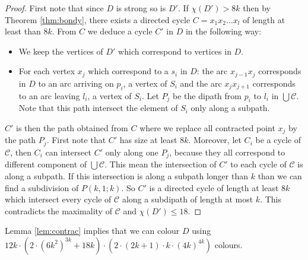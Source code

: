 \documentclass[utf8,10pt]{article}
\theoremstyle{plain}
\theoremstyle{definition}
\theoremstyle{remark}
\newcommand{\dr}{ (2k+1)\cdot k \cdot (4k)^{4k}}
\newcommand{\col}{(6k^2)^{3k}}
\begin{document}
\begin{proof}
First note that since $D$ is strong so is $D'$. If $\chi(D') > 8k$ then by Theorem \ref{thm:bondy}, there exists
a directed cycle $C = x_1x_2 \dots x_l$ of length at least than $8k$. From $C$ we deduce a cycle $C'$ in $D$ in the following way: 
\begin{itemize}
	\item We keep the vertices of $D'$ which correspond to vertices in $D$.
	\item For each vertex $x_j$ which correspond to a $s_i$ in $D$: the arc $x_{j-1}x_j$ corresponds in $D$ to an arc arriving on 
		$p_i$, a vertex of $S_i$ and the arc $x_jx_{j+1}$ corresponds to an arc leaving $l_i$, a vertex of $S_i$. Let $P_j$ be the dipath 
		from $p_i$ to $l_i$ in $\bigcup \mathcal{C}$. Note that this path intersect the element of $S_i$ only along a subpath. 
\end{itemize}
$C'$ is then the path obtained from $C$ where we replace all contracted point $x_j$ by the path $P_j$. 
First note that $C'$ has size at least $8k$. Moreover, let $C_i$ be a cycle of $\mathcal{C}$, then $C_i$ can
intersect $C'$ only along one $P_j$, because they all correspond to different component of $\bigcup \mathcal{C}$. This mean the
intersection of $C'$ to each cycle of $\mathcal{C}$ is along a subpath. If this intersection is along a subpath longer than $k$ than we can 
find a subdivision of $P(k,1;k)$. So $C'$ is a directed cycle of length at least $8k$ which intersect every cycle of $\mathcal{C}$ along a 
subdipath of length at most $k$. This contradicts the maximality of $\mathcal{C}$ and $\chi(D') \leq 18$.
\end{proof}


Lemma \ref{lem:contrac} implies that we can colour $D$ using $12k \cdot (2\cdot \col + 18k) \cdot (2 \cdot \dr)$ colours.
\end{document}
